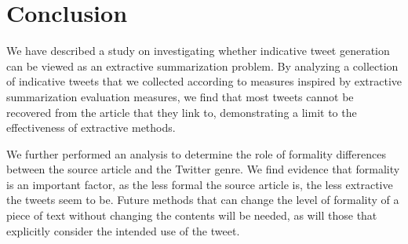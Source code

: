 \section{Conclusion}
We have described a study on investigating whether indicative tweet generation can be viewed as an extractive summarization problem. By analyzing a collection of indicative tweets that we collected according to measures inspired by extractive summarization evaluation measures, we 
find that most tweets cannot be recovered from the article that they link to, demonstrating a limit to the effectiveness of extractive methods.

We further performed an analysis to determine the role of formality differences between the source article and the Twitter genre. We find evidence that formality is an important factor, as the less formal the source article is, the less extractive the tweets seem to be. Future methods that can change the level of formality of a piece of text without changing the contents will be needed, as will those that explicitly consider the intended use of the tweet.